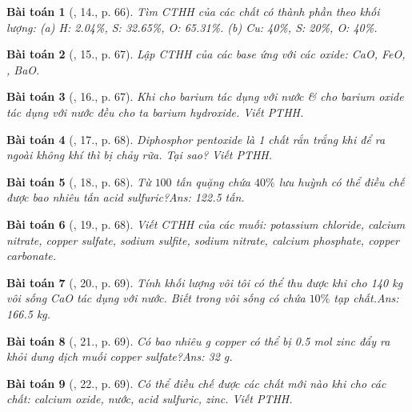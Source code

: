 \documentclass{article}
\newtheorem{baitoan}{Bài toán}
\begin{document}
\begin{baitoan}[\cite{An_Hoa_Hoc_nang_cao_8_9}, 14., p. 66]
	Tìm {\rm CTHH} của các chất có thành phần theo khối lượng: {\rm(a) H: 2.04\%, S: 32.65\%, O: 65.31\%. (b) Cu: 40\%, S: 20\%, O: 40\%}.
\end{baitoan}

\begin{baitoan}[\cite{An_Hoa_Hoc_nang_cao_8_9}, 15., p. 67]
	Lập {\rm CTHH} của các base ứng với các oxide: {\rm CaO, FeO, , BaO}.
\end{baitoan}

\begin{baitoan}[\cite{An_Hoa_Hoc_nang_cao_8_9}, 16., p. 67]
	Khi cho barium tác dụng với nước \& cho barium oxide tác dụng với nước đều cho ta barium hydroxide. Viết {\rm PTHH}.
\end{baitoan}

\begin{baitoan}[\cite{An_Hoa_Hoc_nang_cao_8_9}, 17., p. 68]
	Diphosphor pentoxide là 1 chất rắn trắng khi để ra ngoài không khí thì bị chảy rữa. Tại sao? Viết {\rm PTHH}.
\end{baitoan}
\begin{baitoan}[\cite{An_Hoa_Hoc_nang_cao_8_9}, 18., p. 68]
	Từ $100$ tấn quặng chứa $40\%$ lưu huỳnh có thể điều chế được bao nhiêu tấn acid sulfuric?\hfill{\sf Ans: 122.5 tấn.}
\end{baitoan}

\begin{baitoan}[\cite{An_Hoa_Hoc_nang_cao_8_9}, 19., p. 68]
	Viết {\rm CTHH} của các muối: potassium chloride, calcium nitrate, copper sulfate, sodium sulfite, sodium nitrate, calcium phosphate, copper carbonate.
\end{baitoan}

\begin{baitoan}[\cite{An_Hoa_Hoc_nang_cao_8_9}, 20., p. 69]
	Tính khối lượng vôi tôi {\rm{}} có thể thu được khi cho {\rm 140 kg} vôi sống {\rm CaO} tác dụng với nước. Biết trong vôi sống có chứa $10\%$ tạp chất.\hfill{\sf Ans: 166.5 kg.}
\end{baitoan}

\begin{baitoan}[\cite{An_Hoa_Hoc_nang_cao_8_9}, 21., p. 69]
	Có bao nhiêu {\rm g} copper có thể bị {\rm0.5 mol} zinc đẩy ra khỏi dung dịch muối copper sulfate?\hfill{\sf Ans: 32 g.}
\end{baitoan}

\begin{baitoan}[\cite{An_Hoa_Hoc_nang_cao_8_9}, 22., p. 69]
	Có thể điều chế được các chất mới nào khi cho các chất: calcium oxide, nước, acid sulfuric, zinc. Viết {\rm PTHH}.
\end{baitoan}
\end{document}
